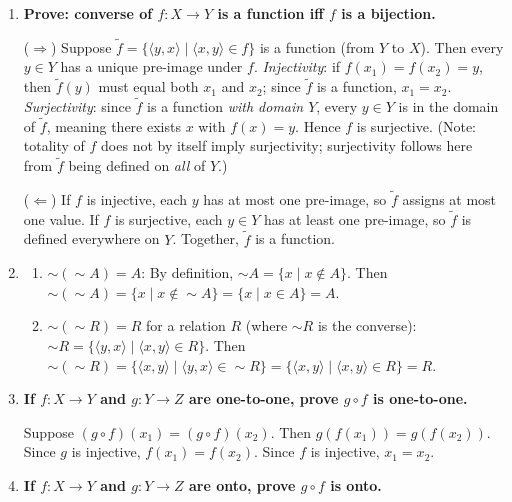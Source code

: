 \documentclass[11pt,openany]{book}
\begin{document}
\begin{enumerate}[{0.}1. ]
\item \textbf{Prove: converse of $f: X \to Y$ is a function iff $f$ is a bijection.}

($\Rightarrow$) Suppose $\tilde{f} = \{\langle y,x\rangle \mid \langle x,y\rangle \in f\}$ is a function (from $Y$ to $X$). Then every $y \in Y$ has a unique pre-image under $f$. \textit{Injectivity}: if $f(x_1)=f(x_2)=y$, then $\tilde{f}(y)$ must equal both $x_1$ and $x_2$; since $\tilde{f}$ is a function, $x_1=x_2$. \textit{Surjectivity}: since $\tilde{f}$ is a function \emph{with domain $Y$}, every $y \in Y$ is in the domain of $\tilde{f}$, meaning there exists $x$ with $f(x)=y$. Hence $f$ is surjective. (Note: totality of $f$ does not by itself imply surjectivity; surjectivity follows here from $\tilde{f}$ being defined on \emph{all} of $Y$.)

($\Leftarrow$) If $f$ is injective, each $y$ has at most one pre-image, so $\tilde{f}$ assigns at most one value. If $f$ is surjective, each $y \in Y$ has at least one pre-image, so $\tilde{f}$ is defined everywhere on $Y$. Together, $\tilde{f}$ is a function.

\item
\begin{enumerate}
\item $\sim(\sim A)= A$: By definition, $\sim A = \{x \mid x \notin A\}$. Then $\sim(\sim A) = \{x \mid x \notin \sim A\} = \{x \mid x \in A\} = A$.

\item $\sim(\sim R)= R$ for a relation $R$ (where $\sim R$ is the converse): $\sim R = \{\langle y,x\rangle \mid \langle x,y\rangle \in R\}$. Then $\sim(\sim R) = \{\langle x,y\rangle \mid \langle y,x\rangle \in \sim R\} = \{\langle x,y\rangle \mid \langle x,y\rangle \in R\} = R$.
\end{enumerate}

\item \textbf{If $f: X\to Y$ and $g: Y\to Z$ are one-to-one, prove $g\circ f$ is one-to-one.}

Suppose $(g\circ f)(x_1) = (g\circ f)(x_2)$. Then $g(f(x_1))=g(f(x_2))$. Since $g$ is injective, $f(x_1)=f(x_2)$. Since $f$ is injective, $x_1=x_2$.

\item \textbf{If $f: X\to Y$ and $g: Y\to Z$ are onto, prove $g\circ f$ is onto.}


\end{enumerate}
\end{document}
